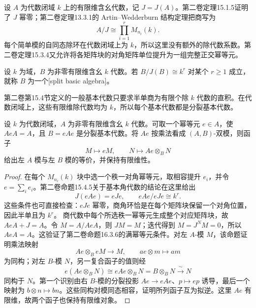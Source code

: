 设 \(A\) 为代数闭域 \(k\) 上的有限维含幺代数，记 \(J=J(A)\)。第二卷定理15.1.5证明了 \(J\) 幂零；第二卷定理13.3.1的 Artin--Wedderburn 结构定理把商写为
\[
	A/J\cong\prod_{i=1}^r M_{n_i}(k).
\]
每个简单模的自同态除环在代数闭域上为 \(k\)，所以这里没有额外的除代数系数。第二卷定理15.3.4又允许将各矩阵块的对角矩阵单位提升为一组完整正交幂等元。
\begin{definition}\label{b5:def:split-basic-algebra}
	设 \(k\) 为域，\(B\) 为非零有限维含幺 \(k\) 代数。若 \(B/J(B)\cong k^r\) 对某个 \(r\ge1\) 成立，就称 \(B\) 为一个[split basic algebra]。
\end{definition}
第二卷第15.4节定义的一般基本代数只要求半单商为有限个除 \(k\) 代数的直积。在代数闭域上，这些有限维除代数均为 \(k\)，所以每个基本代数都是分裂基本代数。
\begin{proposition}\label{b5:prop:basic-morita-reduction}
	设 \(k\) 为代数闭域，\(A\) 为非零有限维含幺 \(k\) 代数。可取一个幂等元 \(e\in A\)，使 \(AeA=A\)，且 \(B=eAe\) 是分裂基本代数。将 \(Ae\) 按乘法看成 \((A,B)\)-双模，则函子
	\[
		M\longmapsto eM,\qquad N\longmapsto Ae\otimes_B N
	\]
	给出左 \(A\) 模与左 \(B\) 模的等价，并保持有限维性。
\end{proposition}
\begin{proof}
	在每个 \(M_{n_i}(k)\) 块中选一个秩一对角幂等元，取相容提升 \(e_i\)，并令 \(e=\sum_i e_i\)。第二卷命题15.4.5关于基本角代数的结论在这里给出
	\[
		J(eAe)=eJe,\qquad eAe/eJe\cong k^r.
	\]
	这些条件也可直接检查：\(eJe\) 幂零，商角环恰是在每个矩阵块保留一个对角位置，因此半单且为 \(k^r\)。
	商代数中每个所选秩一幂等元生成整个对应矩阵块，故 \(AeA+J=A\)。令 \(M=A/AeA\)，则 \(JM=M\)；迭代得到 \(M=J^NM=0\)，所以 \(AeA=A\)。这验证了第二卷命题16.3.6的满幂等元条件。对左 \(A\)-模 \(M\)，该命题证明乘法映射
	\[
		Ae\otimes_B eM\longrightarrow M,\qquad ae\otimes m\longmapsto am
	\]
	为同构；对左 \(B\)-模 \(N\)，另一复合函子的值则经
	\[
		e(Ae\otimes_BN)\cong eAe\otimes_BN =B\otimes_BN\xrightarrow{\ \sim\ }N
	\]
	同构于 \(N\)。第一个识别由右 \(B\)-模的分裂投影 \(Ae\to eAe\)、\(p\mapsto ep\) 诱导，最后一个映射为 \(b\otimes n\mapsto bn\)。这些同构对模同态相容，证明所列函子互为拟逆。这里 \(Ae\) 有限维，故两个函子也保持有限维对象。
\end{proof}
